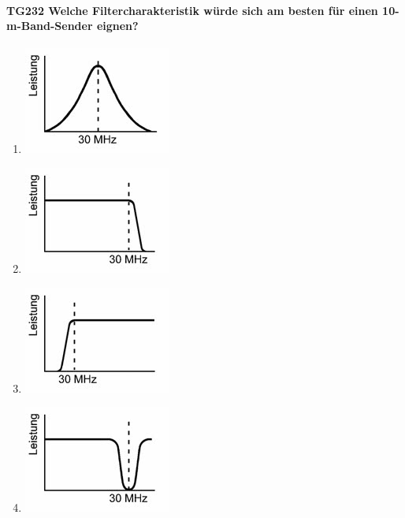 \documentclass[8pt]{article}
\begin{document}
\paragraph*{TG232 Welche Filtercharakteristik würde sich am besten für einen 10-m-Band-Sender eignen?} 
\begin{enumerate}[nolistsep,label=\Alph*]
\item
\begin{center}
	\begin{minipage}{\linewidth}
		\centering
		\includegraphics[scale=1.0]{pics/tg232_a.jpg}
	\end{minipage}
\end{center}
\item
\begin{center}
	\begin{minipage}{\linewidth}
		\centering
		\includegraphics[scale=1.0]{pics/tg232_b.jpg}
	\end{minipage}
\end{center}
\item
\begin{center}
	\begin{minipage}{\linewidth}
		\centering
		\includegraphics[scale=1.0]{pics/tg232_c.jpg}
	\end{minipage}
\end{center}
\item
\begin{center}
	\begin{minipage}{\linewidth}
		\centering
		\includegraphics[scale=1.0]{pics/tg232_d.jpg}
	\end{minipage}
\end{center}
\end{enumerate}
\end{document}
